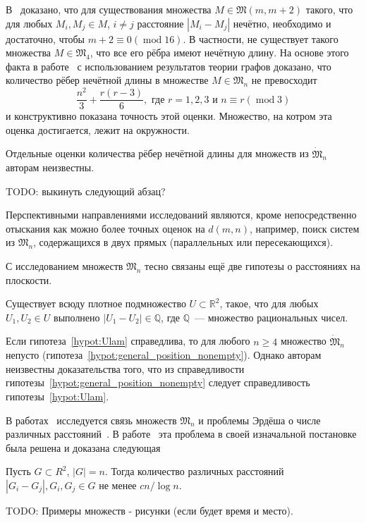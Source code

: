В~\cite{graham1974there} доказано, что
для существования множества $M\in\mathfrak{M}(m,m+2)$ такого, что для любых
$M_i,M_j\in M$, $i\neq j$ расстояние $|M_i-M_j|$ нечётно,
необходимо и достаточно, чтобы
$m+2\equiv 0 (\operatorname{mod} 16)$.
В частности, не существует такого множества $M\in\mathfrak{M}_4$,
что все его рёбра имеют нечётную длину.
На основе этого факта в работе~\cite{piepmeyer1996maximum} с использованием результатов теории графов доказано,
что количество рёбер нечётной длины в множестве $M\in\mathfrak{M}_n$ не превосходит
\begin{equation}
	\frac{n^2}{3} + \frac{r(r - 3)}{6}, \mbox{~где~} r = 1, 2, 3 \mbox{~и~} n \equiv r (\operatorname{mod} 3)
\end{equation}
и конструктивно показана точность этой оценки.
Множество, на котром эта оценка достигается, лежит на окружности.

Отдельные оценки количества рёбер нечётной длины для множеств из $\dot{\mathfrak{M}}_n$
авторам неизвестны.







TODO: выкинуть следующий абзац?

Перспективными направлениями исследований являются, кроме непосредственно отыскания как можно более точных оценок на $d(m,n)$,
например, поиск систем из $\mathfrak{M}_n$, содержащихся в двух прямых (параллельных или пересекающихся).




С исследованием множеств $\mathfrak{M}_n$ тесно связаны ещё две гипотезы о расстояниях на плоскости.
\begin{hypothesis}
	\label{hypot:Ulam}
	Существует всюду плотное подмножество $U\subset\mathbb{R}^2$, такое,
	что для любых $U_1, U_2 \in U$ выполнено $|U_1 - U_2|\in\mathbb{Q}$,
	где $\mathbb{Q}$~--- множество рациональных чисел.
\end{hypothesis}
Если гипотеза~\ref{hypot:Ulam} справедлива, то для любого $n\geq 4$ множество $\dot{\mathfrak{M}}_n$ непусто
(гипотеза~\ref{hypot:general_position_nonempty}).
Однако авторам неизвестны доказательства того, что из справедливости
гипотезы~\ref{hypot:general_position_nonempty} следует справедливость гипотезы~\ref{hypot:Ulam}.


В работах~\cite{garibaldi2005erdos,garibaldi2011erdos} исследуется связь множеств $\mathfrak{M}_n$ и
проблемы Эрдёша о числе различных расстояний~\cite{erdos1946sets}.
В работе~\cite{guth2015erdos} эта проблема в своей изначальной постановке была решена и доказана следующая
\begin{theorem}
	Пусть $G\subset{R}^2$, $|G| = n$.
	Тогда количество различных расстояний $|G_i - G_j|, G_i,G_j \in G$
	не менее $cn/\log n $.
\end{theorem}




TODO: Примеры множеств - рисунки (если будет время и место).

